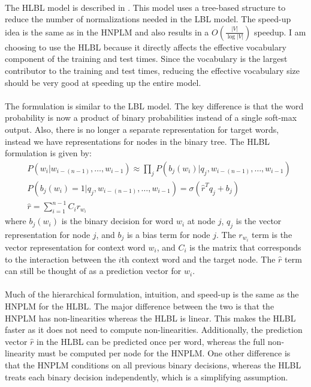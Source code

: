 \paragraph{}
The HLBL model is described in \cite{MnihHinton2009}. This model uses a tree-based structure to reduce the number of normalizations needed in the LBL model. The speed-up idea is the same as in the HNPLM and also results in a $O(\frac{|V|}{\log|V|})$ speedup. I am choosing to use the HLBL because it directly affects the effective vocabulary component of the training and test times. Since the vocabulary is the largest contributor to the training and test times, reducing the effective vocabulary size should be very good at speeding up the entire model.

\paragraph{}
The formulation is similar to the LBL model. The key difference is that the word probability is now a product of binary probabilities instead of a single soft-max output. Also, there is no longer a separate representation for target words, instead we have representations for nodes in the binary tree. The HLBL formulation is given by:
\begin{align}
&P(w_i | w_{i-(n-1)},\dots, w_{i-1})  \approx \prod_j P(b_j(w_i) | q_j, w_{i-(n-1)},\dots, w_{i-1}) \label{eq:HLBL}
\\ 
&P(b_j(w_i) = 1 | q_j, w_{i-(n-1)},\dots, w_{i-1}) =  \sigma( \hat{r}^T q_{j} +b_{j})
\\ 
&\hat{r} = \sum_{i=1}^{n-1} C_i r_{w_i} \nonumber
\end{align}
where $b_j(w_i)$ is the binary decision for word $w_i$ at node $j$, $q_j$ is the vector representation for node $j$, and $b_{j}$ is a bias term for node $j$. The $r_{w_i}$ term is the vector representation for context word $w_i$, and $C_i$ is the matrix that corresponds to the interaction between the $i$th context word and the target node.  The $\hat{r}$ term can still be thought of as a prediction vector for $w_i$. 

\paragraph{}
Much of the hierarchical formulation, intuition, and speed-up is the same as the HNPLM for the HLBL. The major difference between the two is that the HNPLM has non-linearities whereas the HLBL is linear. This makes the HLBL faster as it does not need to compute non-linearities. Additionally, the prediction vector $\hat{r}$ in the HLBL can be predicted once per word, whereas the full non-linearity must be computed per node for the HNPLM. One other difference is that the HNPLM conditions on all previous binary decisions, whereas the HLBL treats each binary decision independently, which is a simplifying assumption. 

